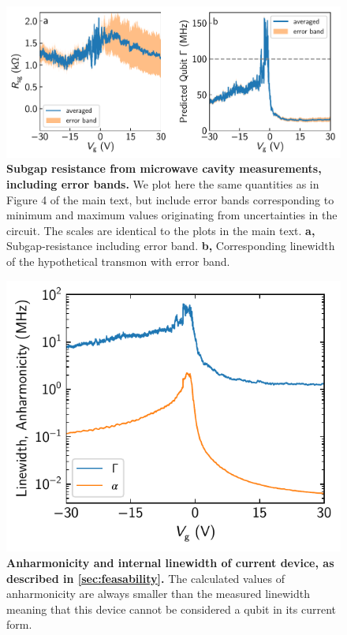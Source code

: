 \documentclass[preprint,
  onecolumn,
  notitlepage,
  amsmath,amssymb,
  aip,
  apl,
]{revtex4-1}
\begin{document}
\begin{figure}[]
    \centering
    \includegraphics[width=\linewidth]{./figs/fig4_supp_bands}
    \caption[]{\textbf{Subgap resistance from microwave cavity measurements, including error bands.}
        We plot here the same quantities as in Figure 4 of the main text, but include error bands corresponding to minimum and maximum values originating from uncertainties in the circuit.
        The scales are identical to the plots in the main text.
        \textbf{a,} Subgap-resistance including error band.
        \textbf{b,} Corresponding linewidth of the hypothetical transmon with error band.
    }
    \label{fig:figure4_bands}
\end{figure}

\begin{figure}[]
    \centering
    \includegraphics[width=.7\linewidth]{figs/supp_anharmonicity_1.pdf}
    \caption{{\bf Anharmonicity and internal linewidth of current device, as described in \ref{sec:feasability}.}
    The calculated values of anharmonicity are always smaller than the measured linewidth meaning that this device cannot be considered a qubit in its current form.}
    \label{fig:anharm1}
\end{figure}
\end{document}
